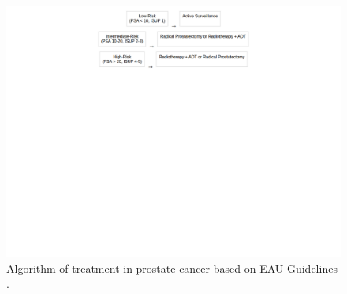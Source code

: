 \documentclass[11pt, a4paper]{article}
\begin{document}
    \begin{figure}[H]
        \centering
        \includegraphics[width=1\textwidth]{treat.png}
        \caption{Algorithm of treatment in prostate cancer based on EAU Guidelines \cite{guidelines_uro_1, guidelines_uro_2}.}
        \label{fig:prostate_treatment_algorithm}
    \end{figure}
\end{document}
